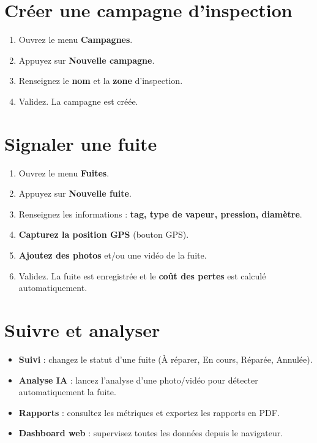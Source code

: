 \documentclass[11pt,a4paper]{article}
\begin{document}
\section{Créer une campagne d'inspection}

\begin{enumerate}[leftmargin=2em]
    \item Ouvrez le menu \textbf{Campagnes}.
    \item Appuyez sur \textbf{Nouvelle campagne}.
    \item Renseignez le \textbf{nom} et la \textbf{zone} d'inspection.
    \item Validez. La campagne est créée.
\end{enumerate}

\section{Signaler une fuite}

\begin{enumerate}[leftmargin=2em]
    \item Ouvrez le menu \textbf{Fuites}.
    \item Appuyez sur \textbf{Nouvelle fuite}.
    \item Renseignez les informations : \textbf{tag, type de vapeur, pression, diamètre}.
    \item \textbf{Capturez la position GPS} (bouton GPS).
    \item \textbf{Ajoutez des photos} et/ou une vidéo de la fuite.
    \item Validez. La fuite est enregistrée et le \textbf{coût des pertes} est calculé automatiquement.
\end{enumerate}

\section{Suivre et analyser}

\begin{itemize}
    \item \textbf{Suivi} : changez le statut d'une fuite (À réparer, En cours, Réparée, Annulée).
    \item \textbf{Analyse IA} : lancez l'analyse d'une photo/vidéo pour détecter automatiquement la fuite.
    \item \textbf{Rapports} : consultez les métriques et exportez les rapports en PDF.
    \item \textbf{Dashboard web} : supervisez toutes les données depuis le navigateur.
\end{itemize}
\end{document}
